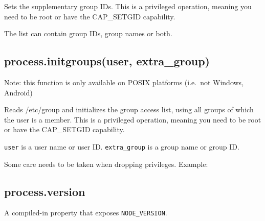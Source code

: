 Sets the supplementary group IDs. This is a privileged operation,
meaning you need to be root or have the CAP\_SETGID capability.

The list can contain group IDs, group names or both.

\subsection{process.initgroups(user,
extra\_group)}\label{process.initgroupsuser-extraux5fgroup}

Note: this function is only available on POSIX platforms (i.e.~not
Windows, Android)

Reads /etc/group and initializes the group access list, using all groups
of which the user is a member. This is a privileged operation, meaning
you need to be root or have the CAP\_SETGID capability.

\texttt{user} is a user name or user ID. \texttt{extra\_group} is a
group name or group ID.

Some care needs to be taken when dropping privileges. Example:

\begin{Shaded}
\begin{Highlighting}[]
\NormalTok{(}\NormalTok{());         }\CommentTok{// [ 0 ]}
\NormalTok{(}\NormalTok{, }\NormalTok{);   }
\NormalTok{(}\NormalTok{());         }\CommentTok{// [ 27, 30, 46, 1000, 0 ]}
\NormalTok{(}\NormalTok{);                     }
\NormalTok{(}\NormalTok{());         }\CommentTok{// [ 27, 30, 46, 1000 ]}
\end{Highlighting}
\end{Shaded}

\subsection{process.version}\label{process.version}

A compiled-in property that exposes \texttt{NODE\_VERSION}.

